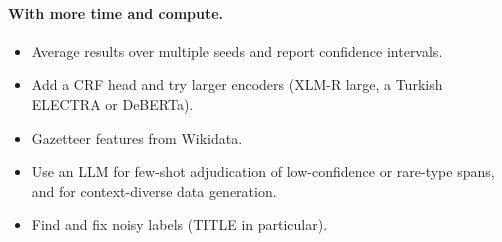 \documentclass[11pt]{article}
\begin{document}
\paragraph{With more time and compute.}
\begin{itemize}
\item Average results over multiple seeds and report confidence intervals.
\item Add a CRF head and try larger encoders (XLM-R large, a Turkish ELECTRA or DeBERTa).
\item Gazetteer features from Wikidata.
\item Use an LLM for few-shot adjudication of low-confidence or rare-type spans, and for context-diverse data generation.
\item Find and fix noisy labels (TITLE in particular).
\end{itemize}


\end{document}
